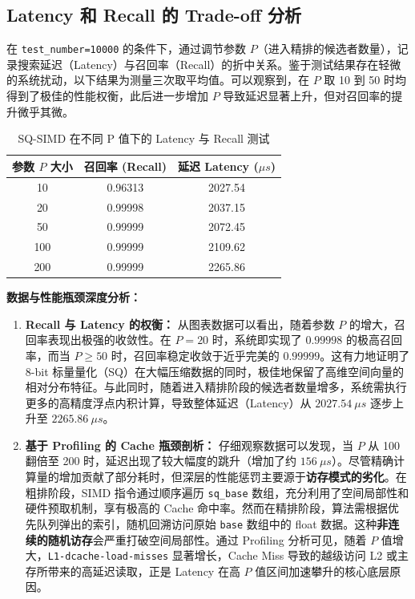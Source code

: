 \documentclass[UTF8,a4paper,10pt]{ctexart}
\begin{document}
\subsection{Latency 和 Recall 的 Trade-off 分析}
在 \texttt{test\_number=10000} 的条件下，通过调节参数 $P$（进入精排的候选者数量），记录搜索延迟（Latency）与召回率（Recall）的折中关系。鉴于测试结果存在轻微的系统扰动，以下结果为测量三次取平均值。可以观察到，在 $P$ 取 10 到 50 时均得到了极佳的性能权衡，此后进一步增加 $P$ 导致延迟显著上升，但对召回率的提升微乎其微。

\begin{table}[H]
    \centering
    \caption{SQ-SIMD 在不同 P 值下的 Latency 与 Recall 测试}
    \begin{tabular}{ccc}
    \toprule
    参数 $P$ 大小 & 召回率 (Recall) & 延迟 Latency ($\mu s$) \\
    \midrule
    10  & 0.96313 & 2027.54 \\
    20  & 0.99998 & 2037.15 \\
    50  & 0.99999 & 2072.45 \\
    100 & 0.99999 & 2109.62 \\
    200 & 0.99999 & 2265.86 \\
    \bottomrule
    \end{tabular}
\end{table}

\textbf{数据与性能瓶颈深度分析：}
\begin{enumerate}
    \item \textbf{Recall 与 Latency 的权衡：} 从图表数据可以看出，随着参数 $P$ 的增大，召回率表现出极强的收敛性。在 $P=20$ 时，系统即实现了 $0.99998$ 的极高召回率，而当 $P \ge 50$ 时，召回率稳定收敛于近乎完美的 $0.99999$。这有力地证明了 8-bit 标量量化（SQ）在大幅压缩数据的同时，极佳地保留了高维空间向量的相对分布特征。与此同时，随着进入精排阶段的候选者数量增多，系统需执行更多的高精度浮点内积计算，导致整体延迟（Latency）从 $2027.54\ \mu s$ 逐步上升至 $2265.86\ \mu s$。
    
    \item \textbf{基于 Profiling 的 Cache 瓶颈剖析：} 仔细观察数据可以发现，当 $P$ 从 100 翻倍至 200 时，延迟出现了较大幅度的跳升（增加了约 $156\ \mu s$）。尽管精确计算量的增加贡献了部分耗时，但深层的性能惩罚主要源于\textbf{访存模式的劣化}。在粗排阶段，SIMD 指令通过顺序遍历 \texttt{sq\_base} 数组，充分利用了空间局部性和硬件预取机制，享有极高的 Cache 命中率。然而在精排阶段，算法需根据优先队列弹出的索引，随机回溯访问原始 \texttt{base} 数组中的 float 数据。这种\textbf{非连续的随机访存}会严重打破空间局部性。通过 Profiling 分析可见，随着 $P$ 值增大，\texttt{L1-dcache-load-misses} 显著增长，Cache Miss 导致的越级访问 L2 或主存所带来的高延迟读取，正是 Latency 在高 $P$ 值区间加速攀升的核心底层原因。
\end{enumerate}
\end{document}

